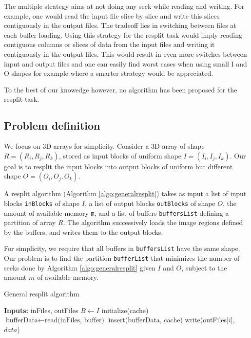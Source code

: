 \documentclass[conference]{IEEEtran}
\begin{document}
The multiple strategy aims at not doing any seek while reading and writing. For
example, one would read the input file slice by slice and write this slices
contiguously in the output files. The tradeoff lies in switching between files
at each buffer loading. Using this strategy for the resplit task would imply
reading contiguous columns or slices of data from the input files and writing it
contiguously in the output files. This would result in even more switches
between input and output files and one can easily find worst cases when using
small I and O shapes for example where a smarter strategy would be appreciated.

To the best of our knowedge however, no algorithm has been proposed for the resplit task.

\subsection{Problem definition}
We focus on 3D arrays for simplicity. Consider a 3D array of shape $R =
(R_i, R_j, R_k)$, stored as input blocks of uniform shape $I =
(I_i, I_j, I_k)$. Our goal is to resplit the input blocks into output
blocks of uniform but different shape $O = (O_i, O_j, O_k)$.

A resplit algorithm (Algorithm \ref{algo:generalresplit}) takes as input a
list of input blocks \texttt{inBlocks} of shape $I$, a list of output
blocks \texttt{outBlocks} of shape $O$, the amount of available memory
\texttt{m}, and a list of buffers \texttt{buffersList} defining a partition
of array $R$. The algorithm successively loads the image regions defined by
the buffers, and writes them to the output blocks.

For simplicity, we require that all buffers in \texttt{buffersList} have
the same shape. Our problem is to find the partition \texttt{bufferList}
that minimizes the number of seeks done by Algorithm
\ref{algo:generalresplit} given $I$ and $O$, subject to the amount $m$
of available memory.

\begin{algorithm}[H]
  \caption{General resplit algorithm}
  \label{algo:generalresplit}
  \begin{algorithmic}
    \STATE \textbf{Inputs:} {inFiles, outFiles}
    \STATE $B \leftarrow I$
    \STATE initialize(cache)
      \STATE $\textrm{bufferData} \leftarrow \textrm{read(inFiles, buffer)}$
      \STATE insert(bufferData, cache)
        \STATE write(outFiles[$i$], $data$)
      \ENDFOR
    \ENDFOR

  \end{algorithmic}
\end{algorithm}
\end{document}
